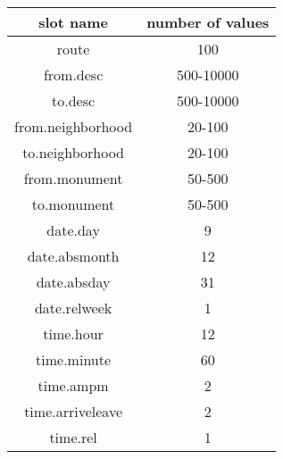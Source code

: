 \begin{tabular}{c|c}
slot name& number of values\\\hline
route&100\\
from.desc&500-10000\\
to.desc&500-10000\\
from.neighborhood&20-100\\
to.neighborhood&20-100\\
from.monument&50-500\\
to.monument&50-500\\
date.day&9\\
date.absmonth&12\\
date.absday&31\\
date.relweek&1\\
time.hour&12\\
time.minute&60\\
time.ampm&2\\
time.arriveleave&2\\
time.rel&1\\
\end{tabular}
